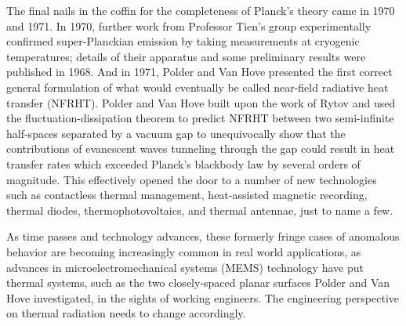 The final nails in the coffin for the completeness of Planck's theory came in 1970 and 1971. In 1970, further work from Professor Tien's group experimentally confirmed super-Planckian emission by taking measurements at cryogenic temperatures;\cite{Domoto1970a} details of their apparatus and some preliminary results were published in 1968.\cite{Cravalho1968} And in 1971, Polder and Van Hove presented the first correct general formulation of what would eventually be called near-field radiative heat transfer (NFRHT).\cite{Polder1971} Polder and Van Hove built upon the work of Rytov and used the fluctuation-dissipation theorem to predict NFRHT between two semi-infinite half-spaces separated by a vacuum gap to unequivocally show that the contributions of evanescent waves tunneling through the gap could result in heat transfer rates which exceeded Planck's blackbody law by several orders of magnitude. This effectively opened the door to a number of new technologies such as contactless thermal management,\cite{Guha2012} heat-assisted magnetic recording,\cite{Challener2009} thermal diodes,\cite{Otey2010, Iizuka2012} thermophotovoltaics,\cite{Narayanaswamy2003, Francoeur2011b} and thermal antennae,\cite{Greffet2002} just to name a few.

As time passes and technology advances, these formerly fringe cases of anomalous behavior are becoming increasingly common in real world applications, as advances in microelectromechanical systems (MEMS) technology have put thermal systems, such as the two closely-spaced planar surfaces Polder and Van Hove investigated, in the sights of working engineers. The engineering perspective on thermal radiation needs to change accordingly.


